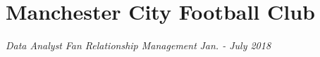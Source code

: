 \documentclass[letterpaper,11pt]{article}
\begin{document}

\newpage
\section{Manchester City Football Club}
\textit{Data Analyst}
\hfill
\textit{Fan Relationship Management}
\hfill
\textit{Jan. - July 2018}
\end{document}

